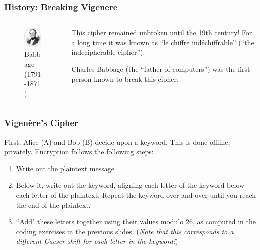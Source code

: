 \documentclass{beamer}
\newcommand{\<}{\langle}
\renewcommand{\>}{\rangle}
\begin{document}
\begin{frame}
\frametitle{History: Breaking Vigenere}
\begin{columns}
\begin{column}{0.5\textwidth}
\begin{figure}
\includegraphics[scale=1]{IMG/babbage.jpg}
\caption{Babbage (1791-1871)}
\end{figure}
\end{column}

\begin{column}{0.5\textwidth}
This cipher remained unbroken until the 19th century! 
For a long time it was known as ``le chiffre ind\'{e}chiffrable'' (``the indecipherable cipher'').\newline

Charles Babbage (the ``father of computers'') was the first person known to break this cipher. 
\end{column}
\end{columns}
\end{frame}


\begin{frame}
\frametitle{Vigen\`{e}re's Cipher}

First, Alice (A) and Bob (B) decide upon a keyword. This is done offline, privately. Encryption follows the following steps:
\begin{enumerate}[1)]
\item Write out the plaintext message
\item Below it, write out the keyword, aligning each letter of the keyword below each letter of the plaintext. Repeat the keyword over and over until you reach the end of the plaintext. 
\item ``Add" these letters together using their values modulo 26, as computed in the coding exercises in the previous slides. (\emph{Note that this corresponds to a different Caeser shift for each letter in the keyword!})
\end{enumerate}
\end{frame}
\end{document}
